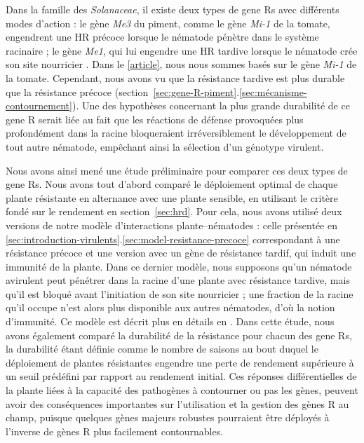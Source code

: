 	 Dans la famille des \textit{Solanaceae}, il existe deux types de \glspl{gene R}
	avec différents modes d'action : le gène \textit{Me3} du piment, comme le gène \textit{Mi-1} de la tomate, engendrent une \gls{HR} précoce lorsque le nématode pénètre dans le système racinaire ; le gène  \textit{Me1}, qui lui engendre une \gls{HR} tardive lorsque le nématode crée son site nourricier \citep{Castagnone-sereno2001,Pegard2005, Djian-Caporalino2011}. 
Dans le \autoref{article},  nous nous sommes basés sur le gène \textit{Mi-1} de la tomate. Cependant, nous avons vu que la résistance tardive est plus durable que la résistance précoce (section~\ref{sec:gene-R-piment}.\ref{sec:mécanisme-contournement}). Une des hypothèses concernant la plus grande durabilité de ce \gls{gene R} serait liée au fait que les réactions de défense provoquées plus profondément dans la racine bloqueraient irréversiblement le développement de tout autre nématode, empêchant ainsi la sélection d'un génotype virulent. 
	
	Nous avons ainsi mené une étude préliminaire pour comparer ces deux types de \glspl{gene R}. Nous avons tout d'abord comparé le déploiement optimal de chaque plante résistante en alternance avec une plante sensible, en utilisant le critère fondé sur le rendement en section~\ref{sec:hrd}. Pour cela, nous avons utilisé deux versions de notre modèle d'interactions plante--nématodes : celle présentée en \ref{sec:introduction-virulents}.\autoref{sec:model-resistance-precoce} correspondant à une résistance précoce et une version avec un gène de résistance tardif, qui induit une \og immunité \fg{} de la plante. Dans ce dernier modèle, nous supposons qu'un nématode avirulent peut pénétrer dans la racine d'une plante avec résistance tardive, mais qu'il est bloqué avant l'initiation de son site nourricier ; une fraction de la racine qu'il occupe n'est alors plus disponible aux autres nématodes, d'où la notion d'immunité. Ce modèle est décrit plus en détails en . Dans cette étude, nous avons également comparé la durabilité de la résistance pour chacun des \glspl{gene R}, la durabilité étant définie comme le nombre de saisons au bout duquel le déploiement de plantes résistantes engendre une perte de rendement supérieure à un seuil prédéfini par rapport au rendement initial. Ces réponses différentielles de la plante liées à la capacité des pathogènes à contourner ou pas les gènes, peuvent avoir des conséquences importantes sur l’utilisation et la gestion des gènes R au champ, puisque quelques gènes majeurs robustes pourraient être déployés  à l’inverse de gènes R plus facilement
contournables.
	
